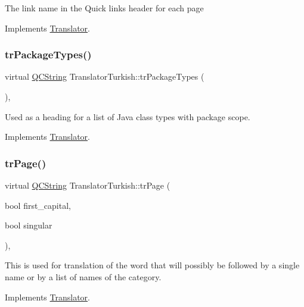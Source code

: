 The link name in the Quick links header for each page 

Implements \mbox{\hyperlink{class_translator}{Translator}}.

\mbox{\label{class_translator_turkish_a31a409e656c2cc8f02aff1f8db9f564b}} 
\subsubsection{\texorpdfstring{trPackageTypes()}{trPackageTypes()}}
{\footnotesize\ttfamily virtual \mbox{\hyperlink{class_q_c_string}{Q\+C\+String}} Translator\+Turkish\+::tr\+Package\+Types (\begin{DoxyParamCaption}{ }\end{DoxyParamCaption})\hspace{0.3cm}{\ttfamily [inline]}, {\ttfamily [virtual]}}

Used as a heading for a list of Java class types with package scope. 

Implements \mbox{\hyperlink{class_translator}{Translator}}.

\mbox{\label{class_translator_turkish_a61831a6276809c0042417b8633443e7e}} 
\subsubsection{\texorpdfstring{trPage()}{trPage()}}
{\footnotesize\ttfamily virtual \mbox{\hyperlink{class_q_c_string}{Q\+C\+String}} Translator\+Turkish\+::tr\+Page (\begin{DoxyParamCaption}\item[{bool}]{first\+\_\+capital,  }\item[{bool}]{singular }\end{DoxyParamCaption})\hspace{0.3cm}{\ttfamily [inline]}, {\ttfamily [virtual]}}

This is used for translation of the word that will possibly be followed by a single name or by a list of names of the category. 

Implements \mbox{\hyperlink{class_translator}{Translator}}.

